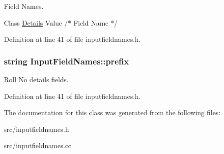 Field Names. 

Class \hyperlink{classDetails}{Details} Value /$\ast$ Field Name $\ast$/ 

Definition at line 41 of file inputfieldnames.\-h.

\hypertarget{classInputFieldNames_a6b73b0278aac9c72ce168717674261c7}{
\subsubsection[{prefix}]{\setlength{\rightskip}{0pt plus 5cm}string Input\-Field\-Names\-::prefix}}\label{classInputFieldNames_a6b73b0278aac9c72ce168717674261c7}


Roll No details fields. 



Definition at line 41 of file inputfieldnames.\-h.



The documentation for this class was generated from the following files\-:\begin{DoxyCompactItemize}
\item 
src/inputfieldnames.\-h\item 
src/inputfieldnames.\-cc\end{DoxyCompactItemize}
